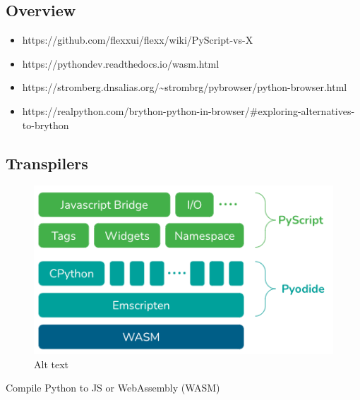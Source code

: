 \hypertarget{overview}{%
\subsection{Overview}\label{overview}}

\begin{itemize}
\tightlist
\item
  https://github.com/flexxui/flexx/wiki/PyScript-vs-X
\item
  https://pythondev.readthedocs.io/wasm.html
\item
  https://stromberg.dnsalias.org/\textasciitilde strombrg/pybrowser/python-browser.html
\item
  https://realpython.com/brython-python-in-browser/\#exploring-alternatives-to-brython
\end{itemize}

\hypertarget{transpilers}{%
\subsection{Transpilers}\label{transpilers}}

\begin{figure}
\centering
\includegraphics{notes/../figures/pyodide-pyscript.png}
\caption{Alt text}
\end{figure}

Compile Python to JS or WebAssembly (WASM)

